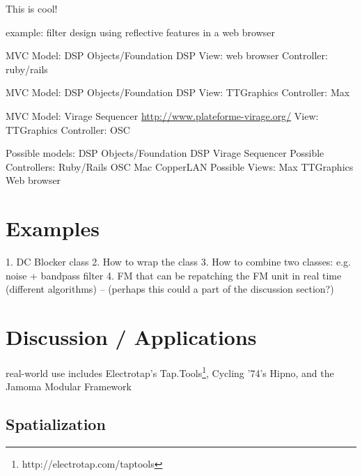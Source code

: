 \documentclass[twoside,10pt]{article}
\begin{document}
This is cool!

example: filter design using reflective features in a web browser

MVC
    Model: DSP Objects/Foundation DSP
    View: web browser
    Controller: ruby/rails

MVC
    Model: DSP Objects/Foundation DSP
    View: TTGraphics
    Controller: Max

MVC
    Model: Virage Sequencer \url{http://www.plateforme-virage.org/}
    View: TTGraphics
    Controller: OSC
    
    
Possible models:
    DSP Objects/Foundation DSP
    Virage Sequencer
Possible Controllers:
    Ruby/Rails
    OSC
    Mac
    CopperLAN
Possible Views:
    Max
    TTGraphics
    Web browser





\section{Examples} %

1. DC Blocker class
2. How to wrap the class
3. How to combine two classes: e.g. noise + bandpass filter
4. FM that can be repatching the FM unit in real time (different algorithms)  -- (perhaps this could a part of the discussion section?) 




\section{Discussion / Applications} %

real-world use includes Electrotap's Tap.Tools\footnote{http://electrotap.com/taptools}, Cycling '74's Hipno\cite{Place:2005}, and the Jamoma Modular Framework\cite{Place:2006}


\subsection{Spatialization}
\end{document}
